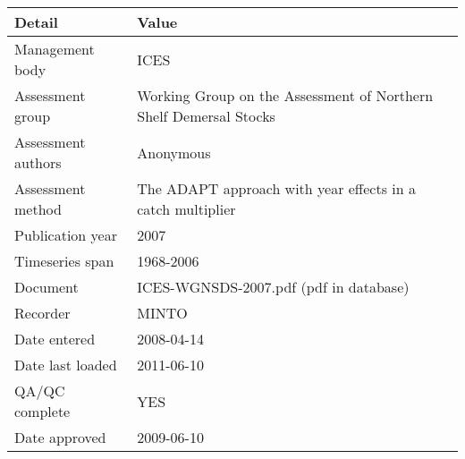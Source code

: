 \begin{table}[htb]
\centering
\begin{tabular}{lp{7cm}}
\toprule
Detail & Value \\
\midrule
Management body    & ICES                                                              \\
Assessment group   & Working Group on the Assessment of Northern Shelf Demersal Stocks \\
Assessment authors & Anonymous                                                         \\
Assessment method  & The ADAPT approach with year effects in a catch multiplier        \\
Publication year   & 2007                                                              \\
Timeseries span    & 1968-2006                                                         \\
Document           & ICES-WGNSDS-2007.pdf (pdf in database)                            \\
Recorder           & MINTO                                                             \\
Date entered       & 2008-04-14                                                        \\
Date last loaded   & 2011-06-10                                                        \\
QA/QC complete     & YES                                                               \\
Date approved      & 2009-06-10                                                        \\
\bottomrule
\end{tabular}
\label{tab:assessdet}
\end{table}
